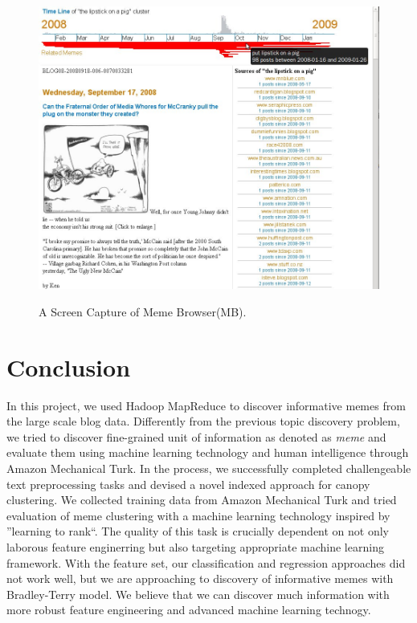\documentclass{sig-alternate}
\begin{document}
\begin{figure}[h!]
	\begin{center}
		{\includegraphics[width=\textwidth]{mockup.jpg}}
	\end{center}
	\caption{A Screen Capture of Meme Browser(MB).}
	\label{fig:mockup}
\end{figure}

\section{Conclusion}
In this project, we used Hadoop MapReduce to discover informative memes from the large scale blog data. Differently from the previous topic discovery problem, we tried to discover fine-grained unit of information as denoted as \emph{meme} and evaluate them using machine learning technology and human intelligence through Amazon Mechanical Turk. In the process, we successfully completed challengeable text preprocessing tasks and devised a novel indexed approach for canopy clustering. We collected training data from Amazon Mechanical Turk and tried evaluation of meme clustering with a machine learning technology inspired by ''learning to rank``. The quality of this task is crucially dependent on not only laborous feature enginerring but also targeting appropriate machine learning framework. With the feature set, our classification and regression approaches did not work well, but we are approaching to discovery of informative memes with Bradley-Terry model. We believe that we can discover much information with more robust feature engineering and advanced machine learning technogy.

%

\end{document}
